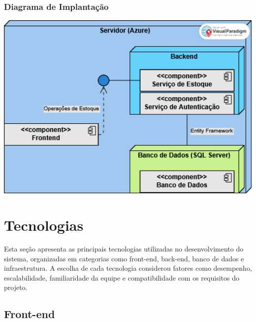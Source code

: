 \documentclass[
	12pt,				%
	openright,			%
	twoside,			%
	a4paper,			%
	english,			%
	french,				%
	spanish,			%
	brazil				%
	]{abntex2}
\begin{document}
\subsubsection{Diagrama de Implantação}


\includegraphics[width=1.0\textwidth]{Figuras/Implantação.png}



\section{Tecnologias}

Esta seção apresenta as principais tecnologias utilizadas no desenvolvimento do sistema, organizadas em categorias como front-end, back-end, banco de dados e infraestrutura. A escolha de cada tecnologia considerou fatores como desempenho, escalabilidade, familiaridade da equipe e compatibilidade com os requisitos do projeto.

\subsection{Front-end}
\end{document}
